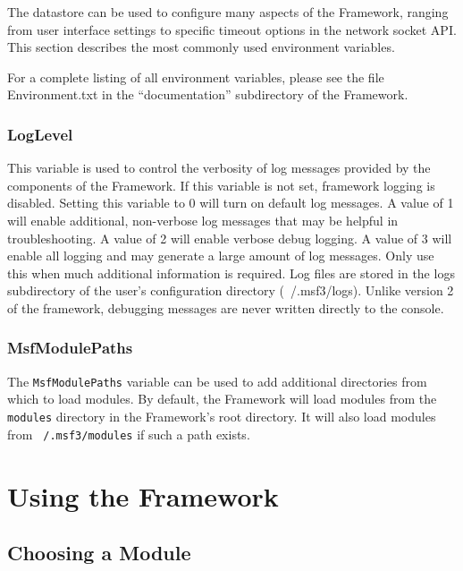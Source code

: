 \documentclass{report}
\begin{document}
\par
The datastore can be used to configure many aspects of the Framework, ranging
from user interface settings to specific timeout options in the network socket
API. This section describes the most commonly used environment variables.

\par
For a complete listing of all environment variables, please see the file
Environment.txt in the ``documentation'' subdirectory of the Framework.

	\subsection{LogLevel}

\par
This variable is used to control the verbosity of log messages provided by the
components of the Framework. If this variable is not set, framework logging is
disabled. Setting this variable to 0 will turn on default log messages. A value
of 1 will enable additional, non-verbose log messages that may be helpful in
troubleshooting. A value of 2 will enable verbose debug logging. A value of 3
will enable all logging and may generate a large amount of log messages. Only
use this when much additional information is required. Log files are stored in
the logs subdirectory of the user's configuration directory (~/.msf3/logs).
Unlike version 2 of the framework, debugging messages are never written directly
to the console.

	\subsection{MsfModulePaths}

\par
The \texttt{MsfModulePaths} variable can be used to add additional directories
from which to load modules. By default, the Framework will load modules from the
\texttt{modules} directory in the Framework's root directory. It will also load
modules from \texttt{~/.msf3/modules} if such a path exists.

\pagebreak

\chapter{Using the Framework}

	\section{Choosing a Module}
\end{document}

